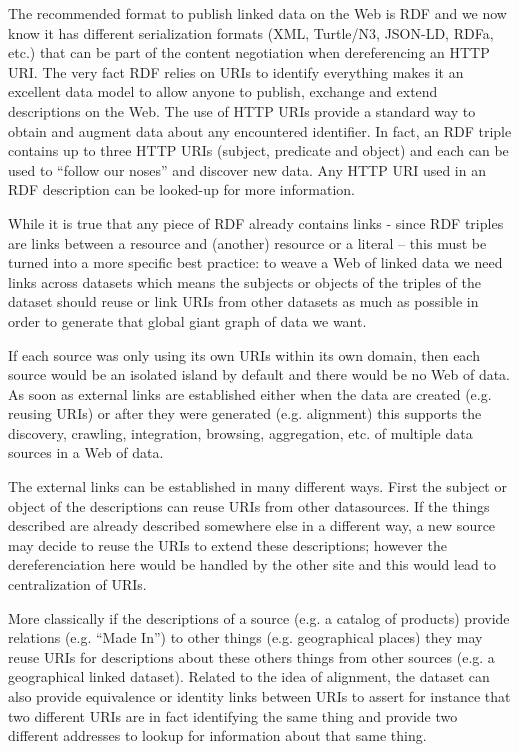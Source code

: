 The recommended format to publish linked data on the Web is RDF and we
now know it has different serialization formats (XML, Turtle/N3,
JSON-LD, RDFa, etc.) that can be part of the content negotiation when
dereferencing an HTTP URI. The very fact RDF relies on URIs to identify
everything makes it an excellent data model to allow anyone to publish,
exchange and extend descriptions on the Web. The use of HTTP URIs
provide a standard way to obtain and augment data about any encountered
identifier. In fact, an RDF triple contains up to three HTTP URIs
(subject, predicate and object) and each can be used to ``follow our
noses'' and discover new data. Any HTTP URI used in an RDF description
can be looked-up for more information.

While it is true that any piece of RDF already contains links - since
RDF triples are links between a resource and (another) resource or a
literal -- this must be turned into a more specific best practice: to
weave a Web of linked data we need links across datasets which means the
subjects or objects of the triples of the dataset should reuse or link
URIs from other datasets as much as possible in order to generate that
global giant graph of data we want.

If each source was only using its own URIs within its own domain, then
each source would be an isolated island by default and there would be no
Web of data. As soon as external links are established either when the
data are created (e.g. reusing URIs) or after they were generated (e.g.
alignment) this supports the discovery, crawling, integration, browsing,
aggregation, etc. of multiple data sources in a Web of data.

The external links can be established in many different ways. First the
subject or object of the descriptions can reuse URIs from other
datasources. If the things described are already described somewhere
else in a different way, a new source may decide to reuse the URIs to
extend these descriptions; however the dereferenciation here would be
handled by the other site and this would lead to centralization of URIs.

More classically if the descriptions of a source (e.g. a catalog of
products) provide relations (e.g. ``Made In'') to other things (e.g.
geographical places) they may reuse URIs for descriptions about these
others things from other sources (e.g. a geographical linked dataset).
Related to the idea of alignment, the dataset can also provide
equivalence or identity links between URIs to assert for instance that
two different URIs are in fact identifying the same thing and provide
two different addresses to lookup for information about that same thing.


